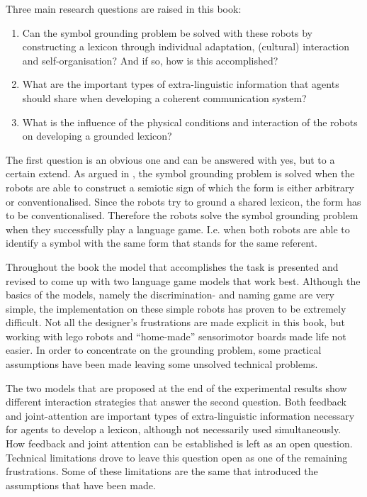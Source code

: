 Three main research questions are raised in this book:

\begin{enumerate}
\item Can the symbol grounding problem be solved with these robots by constructing a lexicon through individual adaptation, (cultural) interaction and self-organisation? And if so, how is this accomplished?
\item What are the important types of extra-linguistic information that agents should share when developing a coherent communication system?
\item What is the influence of the physical conditions and interaction of the robots on developing a grounded lexicon?
\end{enumerate}


The first question is an obvious one and can be answered with yes, but to a certain extend. As argued in , the symbol grounding problem is solved when the robots are able to construct a semiotic sign of which the form is either arbitrary or conventionalised. Since the robots try to ground a shared lexicon, the form has to be conventionalised. Therefore the robots solve the symbol grounding problem when they successfully play a language game. I.e. when both robots are able to identify a symbol with the same form that stands for the same referent. 

Throughout the book the model that accomplishes the task is presented and revised to come up with two language game models that work best. Although the basics of the models, namely the discrimination- and naming game are very simple, the implementation on these simple robots has proven to be extremely difficult. Not all the designer's frustrations are made explicit in this book, but working with {\sc lego} robots and ``home-made'' sensorimotor boards made life not easier. In order to concentrate on the grounding problem, some practical assumptions have been made leaving some unsolved technical problems. 

The two models that are proposed at the end of the experimental results show different interaction strategies that answer the second question. Both feedback and joint-attention are important types of extra-linguistic information necessary for agents to develop a lexicon, although not necessarily used simultaneously. How feedback and joint attention can be established is left as an open question. Technical limitations drove to leave this question open as one of the remaining frustrations. Some of these limitations are the same that introduced the assumptions that have been made. 

